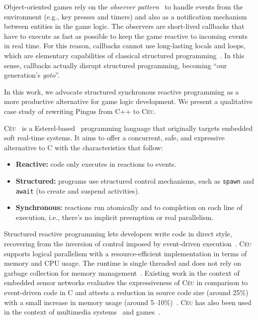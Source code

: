 \documentclass[10pt, conference, compsocconf]{IEEEtran}
\newcommand{\CEU}{\textsc{C\'{e}u}\xspace}
\newcommand{\code}[1] {{\small{\texttt{#1}}}}
\begin{document}
Object-oriented games rely on the \emph{observer pattern}~\cite{games.patterns}
to handle events from the environment (e.g., key presses and timers) and also
as a notification mechanism between entities in the game logic.
%
The observers are short-lived callbacks that have to execute as fast as
possible to keep the game reactive to incoming events in real time.
%
For this reason, callbacks cannot use long-lasting locals and loops, which are
elementary capabilities of classical structured
programming~\cite{rp.deprecating,rp.rescala,sync_async.cooperative}.
%
In this sense, callbacks actually disrupt structured programming, becoming
``our generation's \emph{goto}''.%

In this work, we advocate structured synchronous reactive programming as a more
productive alternative for game logic development.
We present a qualitative case study of rewriting Pingus from C++ to \CEU.

\CEU~\cite{ceu.sensys13,ceu.mod15} is a Esterel-based~\cite{esterel.ieee91}
programming language that originally targets embedded soft real-time systems.
It aims to offer a concurrent, safe, and expressive alternative to C with the
characteristics that follow:
%
\begin{itemize}
\item \textbf{Reactive:} code only executes in reactions to events.
\item \textbf{Structured:} programs use structured control mechanisms, such as
    \code{spawn} and \code{await} (to create and suspend activities).
\item \textbf{Synchronous:} reactions run atomically and to completion on each line of
    execution, i.e., there's no implicit preemption or real parallelism.
\end{itemize}
%
Structured reactive programming lets developers write code in direct style,
recovering from the inversion of control imposed by event-driven
execution~\cite{rp.deprecating,rp.rescala,sync_async.cooperative}.
%
%
\CEU supports logical parallelism with a resource-efficient implementation in
terms of memory and CPU usage.
The runtime is single threaded and does not rely on garbage collection for
memory management~\cite{ceu.sensys13}.
%
Existing work in the context of embedded sensor networks evaluates the
expressiveness of \CEU in comparison to event-driven code in C and attests a
reduction in source code size (around 25\%) with a small increase in memory
usage (around 5--10\%)~\cite{ceu.sensys13}.
%
\CEU has also been used in the context of multimedia
systems~\cite{ceumedia.webmedia16} and games~\cite{ceu.mod15}.
\end{document}
